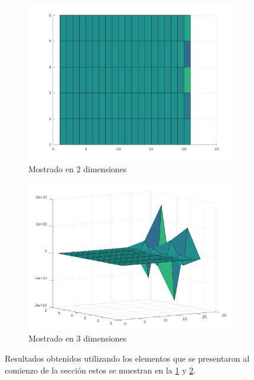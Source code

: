 \documentclass{article}
\begin{document}
\begin{figure}[H]
    \centering
    \begin{subfigure}[b]{0.9\textwidth}
        \centering
        \includegraphics[width=\textwidth]{1.1.png}
        \caption{Mostrado en 2 dimensiones}
        \label{fig:XY}
    \end{subfigure}
    \begin{subfigure}[b]{0.9\textwidth}
        \centering
        \includegraphics[width=\textwidth]{1.2.png}
        \caption{Mostrado en 3 dimensiones}
        \label{fig:XYZ}
    \end{subfigure}
    \caption{Resultados obtenidos utilizando los elementos que se presentaron al comienzo de la sección estos se muestran en la \ref{fig:XY} y \ref{fig:XYZ}.}
    \label{fig:SolucionR}
\end{figure}
\end{document}
